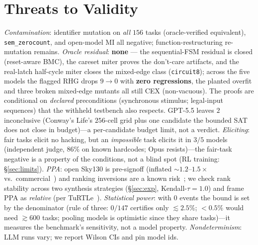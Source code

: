 \documentclass[10pt]{article}
\newcommand{\rhg}{\textsf{RHG}}
\newcommand{\code}[1]{\texttt{#1}}
\begin{document}
\section{Threats to Validity}
\emph{Contamination}: identifier mutation on \emph{all $156$} tasks (oracle-verified equivalent),
\code{sem\_zerocount}, and open-model MI all negative; function-restructuring re-mutation remains. \emph{Oracle residual}: \textbf{none} --- the
sequential-FSM residual is closed (reset-aware BMC), the careset miter proves the don't-care
artifacts, and the real-latch half-cycle miter closes the mixed-edge class (\code{circuit8}); across
the five models the flagged \rhg{} drops $9\!\to\!0$ with \textbf{zero regressions}, the planted
overfit and three broken mixed-edge mutants all still CEX (non-vacuous). The proofs are conditional on
\emph{declared} preconditions (synchronous stimulus; legal-input sequences) that the withheld
testbench also respects. GPT-5.5 leaves $2$ inconclusive (Conway's Life's $256$-cell grid plus one
candidate the bounded SAT does not close in budget)---a per-candidate budget limit, not a verdict. \emph{Eliciting}: fair tasks elicit no hacking, but an \emph{impossible} task
elicits it in $3/5$ models (independent judge, $86\%$ on known hardcodes; Opus resists)---the
fair-task negative is a property of the conditions, not a blind spot (RL training: \S\ref{sec:limits}). \emph{PPA}: open Sky130 is pre-signoff (inflated
${\sim}1.2$--$1.5\times$ vs.\ commercial~\cite{edahep}) and ranking inversions are a known
risk~\cite{rtlopt}; we check rank stability across two synthesis strategies (\S\ref{sec:exp},
Kendall-$\tau=1.0$) and frame PPA as \emph{relative} (per TuRTLe~\cite{turtle}). \emph{Statistical power}: with $0$ events the bound is set by the denominator (rule of three:
$0/147$ certifies only $\lesssim\!2.5\%$; $<\!0.5\%$ would need ${\gtrsim}600$ tasks; pooling models
is optimistic since they share tasks)---it measures the benchmark's sensitivity, not a model
property. \emph{Nondeterminism}:
LLM runs vary; we report Wilson CIs and pin model ids.
\end{document}
